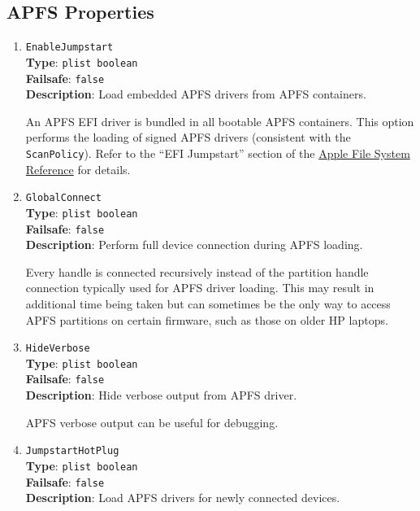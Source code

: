 \documentclass[]{article}
\makeatletter
\renewcommand{\label}[1]{%
\zref@wrapper@immediate{\oldlabel{#1}}}  %
\makeatother
\begin{document}
\subsection{APFS Properties}\label{uefiapfsprops}

\begin{enumerate}

\item
  \texttt{EnableJumpstart}\\
  \textbf{Type}: \texttt{plist\ boolean}\\
  \textbf{Failsafe}: \texttt{false}\\
  \textbf{Description}: Load embedded APFS drivers from APFS containers.

  An APFS EFI driver is bundled in all bootable APFS containers. This
  option performs the loading of signed APFS drivers (consistent with the
  \texttt{ScanPolicy}). Refer to the ``EFI Jumpstart'' section of the
  \href{https://developer.apple.com/support/apple-file-system/Apple-File-System-Reference.pdf}{Apple File System Reference} for details.


\item
  \texttt{GlobalConnect}\\
  \textbf{Type}: \texttt{plist\ boolean}\\
  \textbf{Failsafe}: \texttt{false}\\
  \textbf{Description}: Perform full device connection during APFS loading.

  Every handle is connected recursively instead of the partition handle connection
  typically used for APFS driver loading. This may result in additional time being
  taken but can sometimes be the only way to access APFS partitions on certain
  firmware, such as those on older HP laptops.

\item
  \texttt{HideVerbose}\\
  \textbf{Type}: \texttt{plist\ boolean}\\
  \textbf{Failsafe}: \texttt{false}\\
  \textbf{Description}: Hide verbose output from APFS driver.

  APFS verbose output can be useful for debugging.

\item
  \texttt{JumpstartHotPlug}\\
  \textbf{Type}: \texttt{plist\ boolean}\\
  \textbf{Failsafe}: \texttt{false}\\
  \textbf{Description}: Load APFS drivers for newly connected devices.


\end{enumerate}
\end{document}
